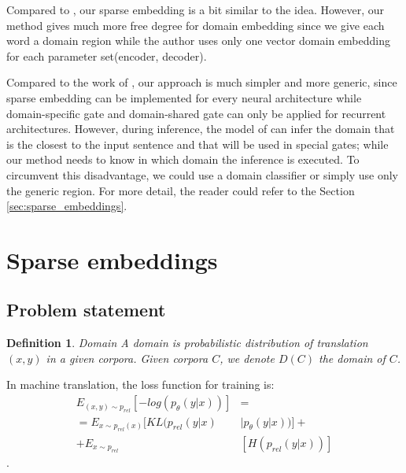 \documentclass[11pt,a4paper]{article}
\newtheorem{definition}{Definition}[section]
\newcommand{\fyTodo}[1]{\Todo[FY>]{\textcolor{orange}{#1}}}
\begin{document}
Compared to \cite{D18-1039}, our sparse embedding is a bit similar to the idea. However, our method gives much more free degree for domain embedding since we give each word a domain region while the author uses only one vector domain embedding for each parameter set(encoder, decoder).

Compared to the work of \cite{D18-1041}, our approach is much simpler and
more generic, since sparse embedding can be implemented for every neural architecture while domain-specific gate and domain-shared gate can only be applied for recurrent architectures. However, during inference, the model of \cite{D18-1041} can infer the domain that is the closest to the input sentence and that will be used in special gates; while our method needs to know in which domain the inference is executed. To circumvent this disadvantage, we could use a domain classifier or simply use only the generic region. For more detail, the reader could refer to the Section \ref{sec:sparse_embeddings}.

\section{Sparse embeddings \label{sec:sparse_embeddings}}
\fyTodo{Use meaningful titles}

\subsection{Problem statement}
\fyTodo{Use math for notation, label equations and such}
\begin{definition}{Domain}
\label{def:domain}
A domain is probabilistic distribution of translation $(x,y)$ in a given corpora. Given corpora $C$, we denote $D(C)$ the domain of $C$.
\end{definition}
\fyTodo{We need more: the source, the target, etc}
In machine translation, the loss function for training is:
\begin{equation}
\begin{split}
E_{(x,y) \sim p_{rel}}[-log(p_{\theta}(y|x))] &= \\
= E_{x \sim p_{rel}(x)}[KL(p_{rel}(y|x) & \mid p_{\theta}(y|x))] + \\
+ E_{x \sim p_{rel}} &[H(p_{rel}(y|x))]
\end{split}
\end{equation}.
\end{document}
